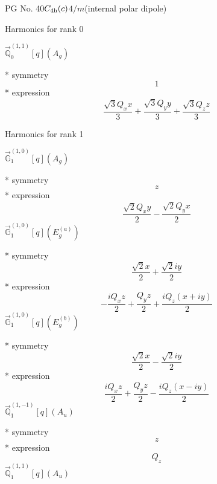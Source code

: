 \documentclass[fleqn,8pt]{jsarticle}
\begin{document}
\setcounter{MaxMatrixCols}{32}

\renewcommand{\tablename}{Table~}
\renewcommand{\figurename}{Figure~}
\begin{center}
\LARGE
PG No. 40\quad$C_{\rm 4h}(c)$\quad$4/m$\quad[ tetragonal ] (internal polar dipole)
\end{center}

\noindent * Harmonics for rank 0

\noindent\quad $\vec{\mathbb{Q}}_{0}^{(1,1)}[q](A_{g})$

\noindent\quad ** symmetry
\begin{dmath*}
1
\end{dmath*}
\noindent\quad ** expression
\begin{dmath*}
\frac{\sqrt{3} Q_{x} x}{3} + \frac{\sqrt{3} Q_{y} y}{3} + \frac{\sqrt{3} Q_{z} z}{3}
\end{dmath*}

\noindent * Harmonics for rank 1

\noindent\quad $\vec{\mathbb{G}}_{1}^{(1,0)}[q](A_{g})$

\noindent\quad ** symmetry
\begin{dmath*}
z
\end{dmath*}
\noindent\quad ** expression
\begin{dmath*}
\frac{\sqrt{2} Q_{x} y}{2} - \frac{\sqrt{2} Q_{y} x}{2}
\end{dmath*}
\noindent\quad $\vec{\mathbb{G}}_{1}^{(1,0)}[q](E_{g}^{(a)})$

\noindent\quad ** symmetry
\begin{dmath*}
\frac{\sqrt{2} x}{2} + \frac{\sqrt{2} i y}{2}
\end{dmath*}
\noindent\quad ** expression
\begin{dmath*}
- \frac{i Q_{x} z}{2} + \frac{Q_{y} z}{2} + \frac{i Q_{z} \left(x + i y\right)}{2}
\end{dmath*}
\noindent\quad $\vec{\mathbb{G}}_{1}^{(1,0)}[q](E_{g}^{(b)})$

\noindent\quad ** symmetry
\begin{dmath*}
\frac{\sqrt{2} x}{2} - \frac{\sqrt{2} i y}{2}
\end{dmath*}
\noindent\quad ** expression
\begin{dmath*}
\frac{i Q_{x} z}{2} + \frac{Q_{y} z}{2} - \frac{i Q_{z} \left(x - i y\right)}{2}
\end{dmath*}
\noindent\quad $\vec{\mathbb{Q}}_{1}^{(1,-1)}[q](A_{u})$

\noindent\quad ** symmetry
\begin{dmath*}
z
\end{dmath*}
\noindent\quad ** expression
\begin{dmath*}
Q_{z}
\end{dmath*}
\noindent\quad $\vec{\mathbb{Q}}_{1}^{(1,1)}[q](A_{u})$
\end{document}
